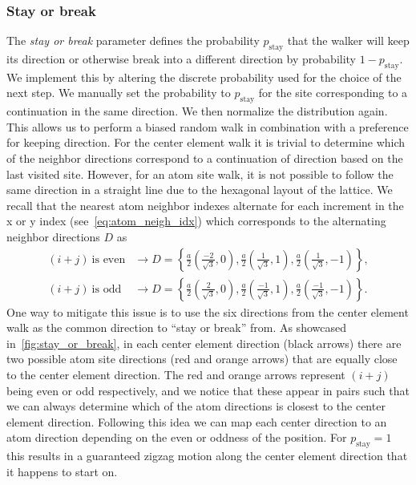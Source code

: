 \subsubsection{Stay or break}
The \textit{stay or break} parameter defines the probability
$p_{\text{stay}}$ that the walker will keep its direction or otherwise break
into a different direction by probability $1-p_{\text{stay}}$. We implement this by altering the discrete probability used for the choice of the next step. We manually set the probability to $p_{\text{stay}}$ for the site corresponding to a continuation in the same direction. We then normalize the distribution again. This allows us to perform a biased random walk in combination with a preference for keeping direction. For the center element
walk it is trivial to determine which of the neighbor directions correspond to
a continuation of direction based on the last visited site. However, for an atom site walk, it is not possible to follow the same direction in a straight line due to the hexagonal layout of the lattice. We recall that the
nearest atom neighbor indexes alternate for each increment in the x or y index (see~\cref{eq:atom_neigh_idx}) which corresponds to the alternating neighbor directions $D$ as
\begin{align*}
  (i + j) \ \text{is even} &\rightarrow D = \left\{ \frac{a}{2}\left(\frac{-2}{\sqrt{3}}, 0\right), \frac{a}{2}\left(\frac{1}{\sqrt{3}}, 1\right), \frac{a}{2}\left(\frac{1}{\sqrt{3}}, -1\right)\right\}, \\
  (i + j) \ \text{is odd} &\rightarrow D = \left\{ \frac{a}{2}\left(\frac{2}{\sqrt{3}}, 0\right), \frac{a}{2}\left(\frac{-1}{\sqrt{3}}, 1\right), \frac{a}{2}\left(\frac{-1}{\sqrt{3}}, -1\right)\right\}.
\end{align*}
One way to mitigate this issue is to use the six directions from the center element walk as the common direction to ``stay or break'' from. As showcased in~\cref{fig:stay_or_break}, in each center element direction (black arrows) there are two possible atom site directions (red and orange arrows) that are equally close to the center element direction. The red and orange arrows represent $(i+j)$ being even or odd respectively, and we notice that these appear in pairs such that we can always determine which of the atom directions is closest to the center element direction. Following this idea we can map each center direction to an atom direction depending on the even or oddness of the position. For $p_{\text{stay}} = 1$ this results in a guaranteed zigzag motion along the center element direction that it happens to start on. 

